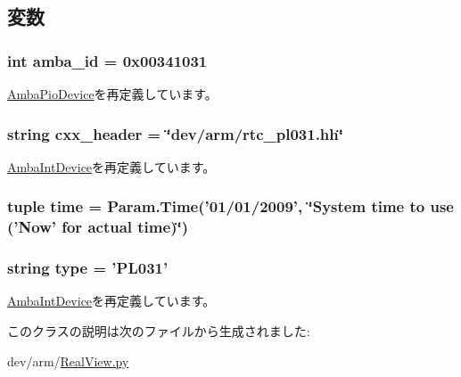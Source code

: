 \subsection{変数}
\hypertarget{classRealView_1_1PL031_a38d7b9edfe6f0eea7a54e7e4f6253f3a}{
\subsubsection[{amba\_\-id}]{\setlength{\rightskip}{0pt plus 5cm}int {\bf amba\_\-id} = 0x00341031}}
\label{classRealView_1_1PL031_a38d7b9edfe6f0eea7a54e7e4f6253f3a}


\hyperlink{classRealView_1_1AmbaPioDevice_ad9d2b9e37de5c1c7c10219fc1b834599}{AmbaPioDevice}を再定義しています。\hypertarget{classRealView_1_1PL031_a17da7064bc5c518791f0c891eff05fda}{
\subsubsection[{cxx\_\-header}]{\setlength{\rightskip}{0pt plus 5cm}string {\bf cxx\_\-header} = \char`\"{}dev/arm/rtc\_\-pl031.hh\char`\"{}}}
\label{classRealView_1_1PL031_a17da7064bc5c518791f0c891eff05fda}


\hyperlink{classRealView_1_1AmbaIntDevice_a17da7064bc5c518791f0c891eff05fda}{AmbaIntDevice}を再定義しています。\hypertarget{classRealView_1_1PL031_a429c35172fbcb8b1788bead147e4719b}{
\subsubsection[{time}]{\setlength{\rightskip}{0pt plus 5cm}tuple {\bf time} = {\bf Param.Time}('01/01/2009', \char`\"{}System {\bf time} to use ('Now' for actual {\bf time})\char`\"{})}}
\label{classRealView_1_1PL031_a429c35172fbcb8b1788bead147e4719b}
\hypertarget{classRealView_1_1PL031_acce15679d830831b0bbe8ebc2a60b2ca}{
\subsubsection[{type}]{\setlength{\rightskip}{0pt plus 5cm}string {\bf type} = '{\bf PL031}'}}
\label{classRealView_1_1PL031_acce15679d830831b0bbe8ebc2a60b2ca}


\hyperlink{classRealView_1_1AmbaIntDevice_acce15679d830831b0bbe8ebc2a60b2ca}{AmbaIntDevice}を再定義しています。

このクラスの説明は次のファイルから生成されました:\begin{DoxyCompactItemize}
\item 
dev/arm/\hyperlink{RealView_8py}{RealView.py}\end{DoxyCompactItemize}
